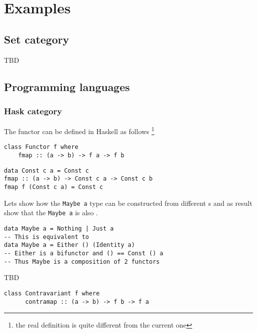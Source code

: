\section{Examples}

\subsection{\textbf{Set} category}
TBD

\subsection{Programming languages}

\subsubsection{\textbf{Hask} category}
The functor can be defined in Haskell as follows
\footnote{the real definition is quite different from the current one}
\begin{example}
\label{ex:functor_haskell}
\begin{verbatim}
class Functor f where
    fmap :: (a -> b) -> f a -> f b
\end{verbatim} 
\end{example}


\begin{example}
\label{ex:terminal_object_cat_hask}
\begin{verbatim}
data Const c a = Const c
fmap :: (a -> b) -> Const c a -> Const c b
fmap f (Const c a) = Const c
\end{verbatim}
\end{example}

\begin{example}
\label{ex:maybe_functor}
Lets show how the \texttt{Maybe a} type can be
constructed from different 
s and as result show that the
\texttt{Maybe a} is also 
. 
\begin{verbatim}
data Maybe a = Nothing | Just a
-- This is equivalent to
data Maybe a = Either () (Identity a)
-- Either is a bifunctor and () == Const () a 
-- Thus Maybe is a composition of 2 functors 
\end{verbatim}
\end{example}

\begin{example}
\label{ex:contravariant_functor_hask}
TBD
\begin{verbatim}
class Contravariant f where
      contramap :: (a -> b) -> f b -> f a
\end{verbatim}
\end{example}

